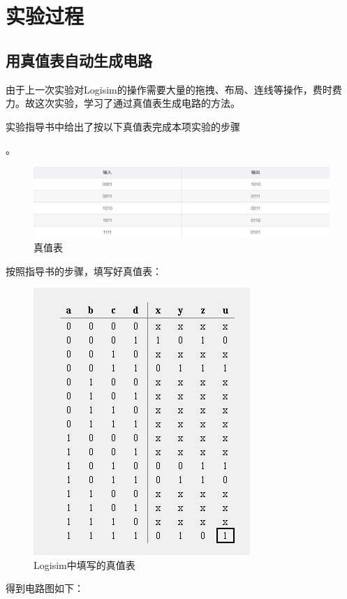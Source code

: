 \documentclass[UTF8]{article}
\begin{document}
	\section{实验过程}
	\subsection{用真值表自动生成电路}
	由于上一次实验对Logisim的操作需要大量的拖拽、布局、连线等操作，费时费力。故这次实验，学习了通过真值表生成电路的方法。\par
	实验指导书中给出了按以下真值表完成本项实验的步骤\par。
	\begin{figure}[H]
		\centering
		\includegraphics[scale=0.4]{BoolList.jpg}
		\caption{真值表}
		\label{BoolList}
	\end{figure}\par
	按照指导书的步骤，填写好真值表：\par
	\begin{figure}[H]
		\centering
		\includegraphics[scale=0.7]{FillingBoolTable.jpg}
		\caption{Logisim中填写的真值表}
		\label{FillingBoolTable}
	\end{figure}\par
	得到电路图如下：\par
\end{document}
